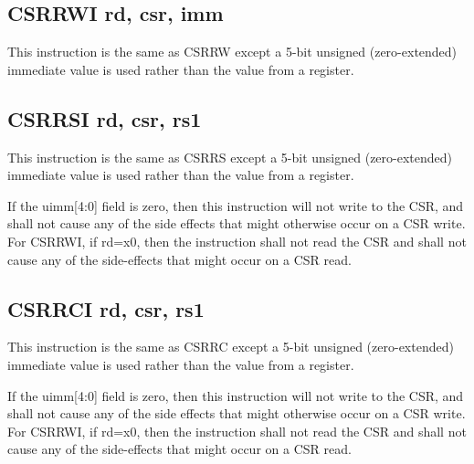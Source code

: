
\subsection{CSRRWI rd, csr, imm}

This instruction is the same as CSRRW except a 5-bit unsigned (zero-extended)
immediate value is used rather than the value from a register.


\subsection{CSRRSI rd, csr, rs1}

This instruction is the same as CSRRS except a 5-bit unsigned (zero-extended)
immediate value is used rather than the value from a register.

If the uimm[4:0] field is zero, then this instruction will not
write to the CSR, and shall not cause any of the side effects that 
might otherwise occur on a CSR write. For CSRRWI, if rd=x0, then 
the instruction shall not read the CSR and shall not cause any
of the side-effects that might occur on a CSR 
read.~\cite[p.~22]{rvismv1v22:2017}


\subsection{CSRRCI rd, csr, rs1}

This instruction is the same as CSRRC except a 5-bit unsigned (zero-extended)
immediate value is used rather than the value from a register.

If the uimm[4:0] field is zero, then this instruction will not
write to the CSR, and shall not cause any of the side effects that 
might otherwise occur on a CSR write. For CSRRWI, if rd=x0, then 
the instruction shall not read the CSR and shall not cause any
of the side-effects that might occur on a CSR 
read.~\cite[p.~22]{rvismv1v22:2017}

